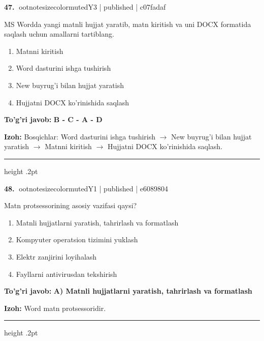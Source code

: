 \documentclass[10pt,a4paper]{article}
\begin{document}
\textbf{\color{ink}47.} {ootnotesizecolor{muted}Y3 | published | c07fadaf}
\par
MS Wordda yangi matnli hujjat yaratib, matn kiritish va uni DOCX formatida saqlash uchun amallarni tartiblang.
\begin{enumerate}[label=\Alph*),leftmargin=9mm]
\item Matnni kiritish
\item Word dasturini ishga tushirish
\item New buyrug'i bilan hujjat yaratish
\item Hujjatni DOCX ko'rinishida saqlash
\end{enumerate}
\begin{tcolorbox}[enhanced,breakable,colback=teal!4,colframe=teal!55!black,boxrule=0.45pt,arc=1.2mm,left=2.8mm,right=2.8mm,top=2mm,bottom=2mm]
\textbf{\color{teal}To'g'ri javob:} \textbf{B - C - A - D}
\par\smallskip
\textbf{Izoh:} Bosqichlar: Word dasturini ishga tushirish \ensuremath{\rightarrow} New buyrug'i bilan hujjat yaratish \ensuremath{\rightarrow} Matnni kiritish \ensuremath{\rightarrow} Hujjatni DOCX ko'rinishida saqlash.
\end{tcolorbox}
\vspace{2mm}\hrule height .2pt\vspace{2mm}

\textbf{\color{ink}48.} {ootnotesizecolor{muted}Y1 | published | e6089804}
\par
Matn protsessorining asosiy vazifasi qaysi?
\begin{enumerate}[label=\Alph*),leftmargin=9mm]
\item Matnli hujjatlarni yaratish, tahrirlash va formatlash
\item Kompyuter operatsion tizimini yuklash
\item Elektr zanjirini loyihalash
\item Fayllarni antivirusdan tekshirish
\end{enumerate}
\begin{tcolorbox}[enhanced,breakable,colback=teal!4,colframe=teal!55!black,boxrule=0.45pt,arc=1.2mm,left=2.8mm,right=2.8mm,top=2mm,bottom=2mm]
\textbf{\color{teal}To'g'ri javob:} \textbf{A) Matnli hujjatlarni yaratish, tahrirlash va formatlash}
\par\smallskip
\textbf{Izoh:} Word matn protsessoridir.
\end{tcolorbox}
\vspace{2mm}\hrule height .2pt\vspace{2mm}
\end{document}
